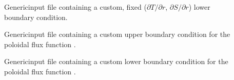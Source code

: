 \documentclass[letterpaper,11pt,english]{sphinxmanual}
\begin{document}
\begin{description}
\item[{}] \leavevmode
\sphinxAtStartPar
Generic\sphinxhyphen{}input file containing a custom, fixed (\(\partial T/\partial r\), \(\partial S/\partial r\)) lower boundary condition.

\item[{}] \leavevmode
\sphinxAtStartPar
Generic\sphinxhyphen{}input file containing a custom upper boundary condition for the poloidal flux function .

\item[{}] \leavevmode
\sphinxAtStartPar
Generic\sphinxhyphen{}input file containing a custom lower boundary condition for the poloidal flux function .

\end{description}
\end{document}
